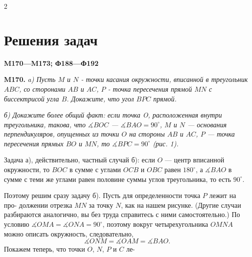 
\setcounter{page}{26}
\setlength{\columnsep}{26pt} %

    \begin{multicols}{2} %
    \vspace*{0.2mm} %
    \section*{Решения задач} %
    \small\textbf{M170---M173; Ф188---Ф192} %

    \vspace{35mm} %
    
    \noindent\textbf{M170.} 
    \textit{a) Пусть $M$ и $N$ - точки касания окружности, вписанной в треугольник $ABC$, со сторонами $AB$ и $AC$, $P$ - точка пересечения прямой $MN$ с биссектрисой угла $B$. Докажите, что угол $BPC$ прямой.}\par
    
    \textit{б) Докажите более общий факт: если точка O, расположенная внутри треугольника, такова, что $\measuredangle BOC$ --- $\measuredangle BAO = 90^\circ$, $M$ и $N$ --- основания перпендикуляров, опущенных из точки $O$ на стороны $AB$ и $AC$, $P$ --- точка пересечения прямых $BO$ и $MN$, то $\measuredangle BPC = 90^\circ$ (рис. 1).}\par
    
    \vspace{2mm}
    
    Задача а), действительно, частный случай б): если $O$ --- центр вписанной окружности, то $BOC$ в сумме с углами $OCB$ и $OBC$ равен $180^\circ$, а $\measuredangle BAO$ в сумме с теми же углами равен половине суммы углов треугольника, то есть $90^\circ$.\par Поэтому решим сразу задачу б). Пусть
    для определенности точка $P$ лежит на про-
    должении отрезка $MN$ за точку $N$, как на нашем рисунке. (Другие случаи разбираются аналогично, вы без труда справитесь с ними самостоятельно.) По условию $\measuredangle OMA = \measuredangle ONA = 90^\circ$, поэтому вокруг четырехугольника $OMNA$ можно описать окружность, следовательно,
    $$\measuredangle ONM = \measuredangle OAM = \measuredangle BAO.$$
    Покажем теперь, что точки $O$, $N$, $P$ и $C$ ле-
    
    \vspace{2mm} %
    

\end{multicols}
